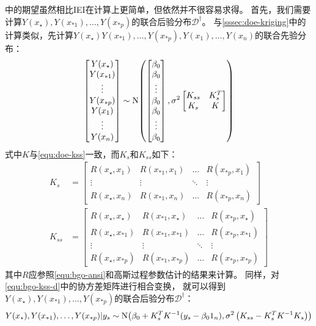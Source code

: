 \documentclass[index]{subfiles}
\begin{document}
中的期望虽然相比IEI在计算上更简单，但依然并不很容易求得。
首先，我们需要计算$Y(x_\star), Y(x_{\ast 1}),\ldots,Y(x_{\ast p})$的联合后验分布$\mathcal{D}^\dag$。
与\cref{sssec:doe-kriging}中的计算类似，先计算$Y(x_\star) Y(x_{\ast 1}),\ldots,Y(x_{\ast p}),Y(x_1),\ldots,Y(x_n)$的联合先验分布：
\begin{equation}\label{equ:bgo-kss-d}
  \begin{bmatrix} Y(x_\star) \\ Y(x_{\ast 1}) \\ \vdots \\ Y(x_{\ast p}) \\ Y(x_1) \\ \vdots \\ Y(x_n) \end{bmatrix}
  \sim \Normal{
    \begin{bmatrix} \beta_0 \\ \beta_0 \\ \vdots \\ \beta_0 \\ \beta_0 \\ \vdots \\ \beta_0 \end{bmatrix}
  }{\sigma^2
    \begin{bmatrix}
      K_{ss} & K_s^T \\
      K_s & K
    \end{bmatrix}
  }
\end{equation}
式中$K$与\cref{equ:doe-kss}一致，而$K_s$和$K_{ss}$如下：
\begin{align}\label{equ:bgo-kss}
  K_s &= \begin{bmatrix}
    R(x_\star, x_1) & R(x_{\ast 1}, x_1) & \ldots & R(x_{\ast p}, x_1) \\
    \vdots & \vdots & \ddots & \vdots \\
    R(x_\star, x_n) & R(x_{\ast 1}, x_n) & \ldots & R(x_{\ast p}, x_n)
  \end{bmatrix} \\
  K_{ss} &= \begin{bmatrix}
    R(x_\star, x_\star) & R(x_{\ast 1}, x_\star) & \ldots & R(x_{\ast p}, x_\star) \\
    R(x_\star, x_{\ast 1}) & R(x_{\ast 1}, x_{\ast 1}) & \ldots & R(x_{\ast p}, x_{\ast 1}) \\
    \vdots & \vdots & \ddots & \vdots \\
    R(x_\star, x_{\ast p}) & R(x_{\ast 1}, x_{\ast p}) & \ldots & R(x_{\ast p}, x_{\ast p})
  \end{bmatrix}
\end{align}
其中$R$应参照\cref{equ:bgo-ansi}和高斯过程参数估计的结果来计算。
同样，对\cref{equ:bgo-kss-d}中的协方差矩阵进行相合变换\cite{clark2012}，
就可以得到$Y(x_\star), Y(x_{\ast 1}),\ldots,Y(x_{\ast p})$的联合后验分布$\mathcal{D}^\dag$：
\begin{equation}\label{equ:bgo-y}
  Y(x_\star), Y(x_{\ast 1}),\ldots,Y(x_{\ast p})|y_s \sim
    \Normal{\beta_0 + K_s^T K^{-1} (y_s - \beta_0 \one_n)}{\sigma^2 \left(K_{ss} - K_s^T K^{-1} K_s\right)}
\end{equation}
\end{document}
